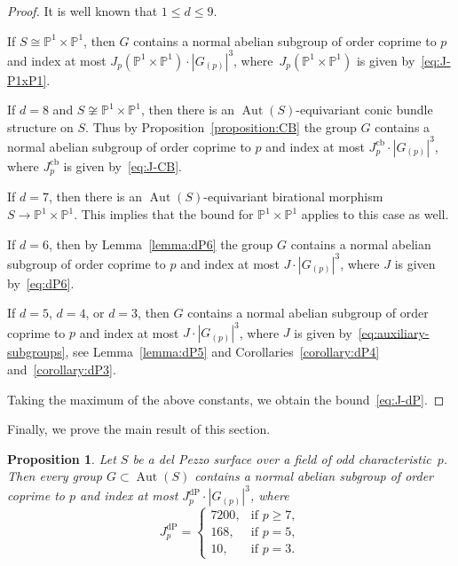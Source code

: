 \documentclass[12pt]{amsart}
\numberwithin{equation}{section}
\newtheorem{proposition}[subsection]{Proposition}
\theoremstyle{definition}
\newcommand{\PP}{\mathbb P}
\DeclareMathOperator{\Aut}{Aut}
\def \ge {\geqslant}
\def \le {\leqslant}
\begin{document}
\begin{proof}
It is well known that $1\le d\le 9$.

If $S\cong\PP^1\times\PP^1$, then $G$
contains a normal abelian subgroup of order coprime to $p$
and index at most
$J_p(\PP^1\times\PP^1)\cdot |G_{(p)}|^3$, where~\mbox{$J_p(\PP^1\times\PP^1)$} is given by~\eqref{eq:J-P1xP1}.


If $d=8$ and $S\not\cong\PP^1\times\PP^1$,
then there is an $\Aut(S)$-equivariant conic bundle structure on $S$.
Thus by Proposition~\ref{proposition:CB} the group
$G$ contains a normal abelian subgroup of order coprime to $p$ and index at most
$J_p^{\mathrm{cb}}\cdot |G_{(p)}|^3$, where $J_p^{\mathrm{cb}}$ is given by~\eqref{eq:J-CB}.

If $d=7$, then
there is an $\Aut(S)$-equivariant birational morphism~\mbox{$S\to\PP^1\times\PP^1$}.
This implies that the bound for $\PP^1\times\PP^1$
applies to this case as well.

If $d=6$, then by Lemma~\ref{lemma:dP6} the group
$G$ contains a normal abelian subgroup of order coprime to $p$
and index at most
$J\cdot |G_{(p)}|^3$, where $J$ is given by~\eqref{eq:dP6}.

If $d=5$, $d=4$, or $d=3$, then
$G$ contains a normal abelian subgroup of order
coprime to $p$ and index at most $J\cdot |G_{(p)}|^3$, where $J$ is given by~\eqref{eq:auxiliary-subgroups}, see Lemma~\ref{lemma:dP5} and
Corollaries~\ref{corollary:dP4} and~\ref{corollary:dP3}.

Taking the maximum of the above constants, we obtain
the bound~\eqref{eq:J-dP}.
\end{proof}

Finally, we prove the main result of this section.

\begin{proposition}\label{proposition:dP-odd}
Let $S$ be a del Pezzo surface over a field
of odd characteristic~$p$.
Then every group $G\subset\Aut(S)$ contains a normal abelian subgroup of order coprime to $p$
and index at most
$J_p^{\mathrm{dP}}\cdot |G_{(p)}|^3$, where
\begin{equation}\label{eq:J-dP-odd}
J_p^{\mathrm{dP}}=
\begin{cases}
7200, &\text{if\ } p\ge 7,\\
168, &\text{if\ } p=5,\\
10, &\text{if\ } p=3.
\end{cases}
\end{equation}
\end{proposition}
\end{document}
